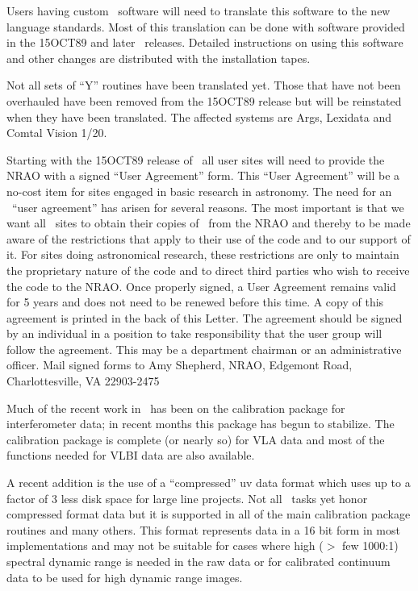    Users having custom \AIPS\ software will need to translate this
software to the new language standards.  Most of this translation can
be done with software provided in the 15OCT89 and later \AIPS\
releases.  Detailed instructions on using this software and other
changes are distributed with the installation tapes.

   Not all sets of ``Y'' routines have been translated yet.  Those
that have not been overhauled have been removed from the 15OCT89
release but will be reinstated when they have been translated.  The
affected systems are Args, Lexidata and Comtal Vision 1/20.



   Starting with the 15OCT89 release of \AIPS\ all user sites will
need to provide the NRAO with a signed ``User Agreement'' form.  This
``User Agreement'' will be a no-cost item for sites engaged in basic
research in astronomy.  The need for an \AIPS\ ``user agreement'' has
arisen for several reasons.  The most important is that we want all
\AIPS\ sites to obtain their copies of \AIPS\ from the NRAO and
thereby to be made aware of the restrictions that apply to their use
of the code and to our support of it.  For sites doing astronomical
research, these restrictions are only to maintain the proprietary
nature of the code and to direct third parties who wish to receive the
code to the \hbox{NRAO}.  Once properly signed, a User Agreement
remains valid for 5 years and does not need to be renewed before this
time.  A copy of this agreement is printed in the back of this
\AIPS Letter.  The agreement should be signed by an individual in a
position to take responsibility that the user group will follow the
agreement.  This may be a department chairman or an administrative
officer.  Mail signed forms to Amy Shepherd, NRAO, Edgemont Road,
Charlottesville, VA 22903-2475



   Much of the recent work in \AIPS\ has been on the calibration
package for interferometer data; in recent months this package has
begun to stabilize.  The calibration package is complete (or nearly
so) for VLA data and most of the functions needed for VLBI data are
also available.

   A recent addition is the use of a ``compressed'' uv data format which
uses up to a factor of 3 less disk space for large line projects.
Not all \AIPS\  tasks yet honor compressed format data but it is
supported in all of the main calibration package routines and many
others.  This format represents data in a 16 bit form in most
implementations and may not be suitable for cases where high ($>$ few
1000:1) spectral dynamic range is needed in the raw data or for
calibrated continuum data to be used for high dynamic range images.

